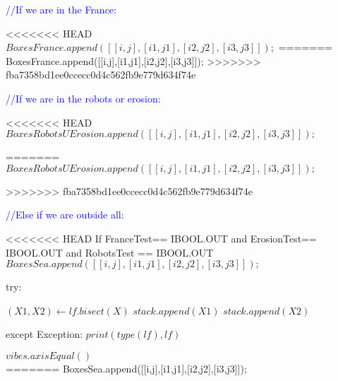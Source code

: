 \begin{algorithm}
\begin{algorithmic}
     		\vspace{0.3 cm}
     	
     	\textcolor{blue}{//If we are in the France:}\
	 	 
<<<<<<< HEAD
     		\State $BoxesFrance.append([[i,j],[i1,j1],[i2,j2],[i3,j3]]);$
	 	\EndIf
=======
     		\STATE BoxesFrance.append([[i,j],[i1,j1],[i2,j2],[i3,j3]]);
	 	\ENDIF
>>>>>>> fba7358bd1ee0ccecc0d4c562fb9e779d634f74e
	 	
	 	\vspace{0.3 cm}
	 	
	 	\textcolor{blue}{//If we are in the robots or erosion:}\
	 	 
<<<<<<< HEAD
     		\State $BoxesRobotsUErosion.append([[i,j],[i1,j1],[i2,j2],[i3,j3]]);$
	 	 
	
	 	 \EndIf
=======
     		\STATE $BoxesRobotsUErosion.append([[i,j],[i1,j1],[i2,j2],[i3,j3]]);$
	 	 
	
	 	 \ENDIF
>>>>>>> fba7358bd1ee0ccecc0d4c562fb9e779d634f74e
	 	 
	 	 \vspace{0.3 cm}
     		
     	

     	
     	\textcolor{blue}{//Else if we are outside all:}\
     
	 	 
<<<<<<< HEAD
	 	 \ElsIf If{ FranceTest== IBOOL.OUT and  ErosionTest== IBOOL.OUT and RobotsTest == IBOOL.OUT}
	 	 \State $BoxesSea.append([[i,j],[i1,j1],[i2,j2],[i3,j3]]);$
	 	 
     	\Else
     	
     		try:
     
          			\State $(X1, X2)\gets lf.bisect(X)$
          			\State $stack.append(X1)$
         			\State $stack.append(X2)$
         		\EndIf
         		
         except Exception:
        		 \State $print(type(lf),lf)  $
         	
  		\EndIf
 	 \EndWhile 
	
	\vspace{0.3 cm}
	
  \State $vibes.axisEqual()$\\
=======
	 	 \STATE BoxesSea.append([[i,j],[i1,j1],[i2,j2],[i3,j3]]);
	 	 

\end{algorithmic}
\end{algorithm}
